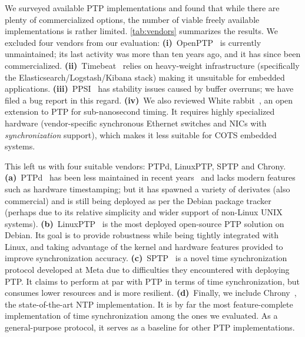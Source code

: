 We surveyed available PTP implementations and found that while there are plenty of commercialized options,
the number of viable freely available implementations is rather limited.
\cref{tab:vendors} summarizes the results. %
We excluded four vendors from our evaluation:
\textbf{(i)}~OpenPTP~\cite{openptp} is currently unmaintained; its last activity was more than ten years ago, and it has since been commercialized.
\textbf{(ii)}~Timebeat~\cite{timebeat} relies on heavy-weight infrastructure
(specifically the Elasticsearch/Logstash/Kibana stack) making it unsuitable for embedded applications.
\textbf{(iii)}~PPSI~\cite{ppsi} has stability issues caused by buffer overruns;
we have filed a bug report\cite{ppsi-bug-report} in this regard.
\textbf{(iv)}~We also reviewed White rabbit~\cite{white-rabbit},
an open extension to PTP for sub-nanosecond timing.
It requires highly specialized hardware
(vendor-specific synchronous Ethernet switches and NICs with \emph{synchronization} support),
which makes it less suitable for COTS embedded systems.

This left us with four suitable vendors: PTPd, LinuxPTP, SPTP and Chrony. %
\textbf{(a)}~PTPd~\cite{ptpd-manpage} %
has been less maintained in recent years~\cite{ptpd-maintainers} and lacks
modern features such as hardware timestamping;
but it has spawned a variety of derivates (also commercial) and is still being 
deployed as per the Debian package tracker~\cite{debian-popularity-contest}
(perhaps due to its relative simplicity and wider support of non-Linux UNIX systems).
\textbf{(b)}~LinuxPTP~\cite{linuxptp-homepage} is the most deployed open-source
PTP solution on Debian.
Its goal is to provide robustness while being tightly integrated with Linux,
and taking advantage of the kernel and hardware features provided to improve
synchronization accuracy.
\textbf{(c)}~SPTP~\cite{facebook-sptp} is a novel time synchronization protocol
developed at Meta due to difficulties they encountered with deploying PTP.
It claims to perform at par with PTP in terms of time synchronization,
but consumes lower resources and is more resilient.
\textbf{(d)}~Finally, we include Chrony~\cite{??}, the state-of-the-art NTP implementation.
It is by far the most feature-complete implementation of time synchronization
among the ones we evaluated.
As a general-purpose protocol, %
it serves as a baseline for other PTP implementations.


